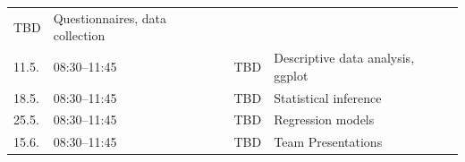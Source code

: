 \documentclass[]{article}
\begin{document}
\begin{longtable}[c]{@{}llll@{}}
\begin{minipage}[t]{0.13\columnwidth}
TBD
\strut\end{minipage} &
\begin{minipage}[t]{0.50\columnwidth}\raggedright\strut
Questionnaires, data collection
\strut\end{minipage}\tabularnewline
\begin{minipage}[t]{0.11\columnwidth}\raggedright\strut
11.5.
\strut\end{minipage} &
\begin{minipage}[t]{0.15\columnwidth}\raggedright\strut
08:30--11:45
\strut\end{minipage} &
\begin{minipage}[t]{0.13\columnwidth}\raggedright\strut
TBD
\strut\end{minipage} &
\begin{minipage}[t]{0.50\columnwidth}\raggedright\strut
Descriptive data analysis, ggplot
\strut\end{minipage}\tabularnewline
\begin{minipage}[t]{0.11\columnwidth}\raggedright\strut
18.5.
\strut\end{minipage} &
\begin{minipage}[t]{0.15\columnwidth}\raggedright\strut
08:30--11:45
\strut\end{minipage} &
\begin{minipage}[t]{0.13\columnwidth}\raggedright\strut
TBD
\strut\end{minipage} &
\begin{minipage}[t]{0.50\columnwidth}\raggedright\strut
Statistical inference
\strut\end{minipage}\tabularnewline
\begin{minipage}[t]{0.11\columnwidth}\raggedright\strut
25.5.
\strut\end{minipage} &
\begin{minipage}[t]{0.15\columnwidth}\raggedright\strut
08:30--11:45
\strut\end{minipage} &
\begin{minipage}[t]{0.13\columnwidth}\raggedright\strut
TBD
\strut\end{minipage} &
\begin{minipage}[t]{0.50\columnwidth}\raggedright\strut
Regression models
\strut\end{minipage}\tabularnewline
\begin{minipage}[t]{0.11\columnwidth}\raggedright\strut
15.6.
\strut\end{minipage} &
\begin{minipage}[t]{0.15\columnwidth}\raggedright\strut
08:30--11:45
\strut\end{minipage} &
\begin{minipage}[t]{0.13\columnwidth}\raggedright\strut
TBD
\strut\end{minipage} &
\begin{minipage}[t]{0.50\columnwidth}\raggedright\strut
Team Presentations
\strut\end{minipage}\tabularnewline
\bottomrule
\end{longtable}
\end{document}
